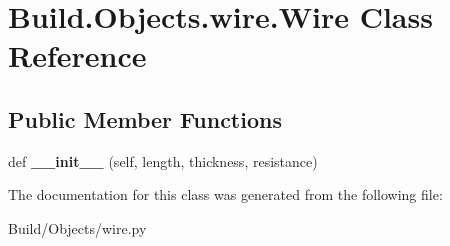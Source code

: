 \hypertarget{class_build_1_1_objects_1_1wire_1_1_wire}{}\section{Build.\+Objects.\+wire.\+Wire Class Reference}
\label{class_build_1_1_objects_1_1wire_1_1_wire}
\subsection*{Public Member Functions}
\begin{DoxyCompactItemize}
\item 
\mbox{\label{class_build_1_1_objects_1_1wire_1_1_wire_a08fcb1c42a58e7f7102417032aec3fd4}} 
def {\bfseries \+\_\+\+\_\+init\+\_\+\+\_\+} (self, length, thickness, resistance)
\end{DoxyCompactItemize}


The documentation for this class was generated from the following file\+:\begin{DoxyCompactItemize}
\item 
Build/\+Objects/wire.\+py\end{DoxyCompactItemize}
